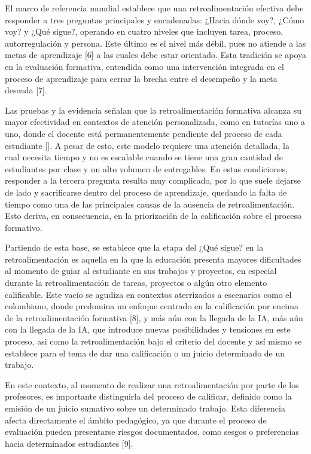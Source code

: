\documentclass[letterpaper, 10 pt, conference]{ieeeconf}  %
\begin{document}
    El marco de referencia mundial establece que una retroalimentación efectiva debe responder a tres preguntas principales y encadenadas: ¿Hacia dónde voy?, ¿Cómo voy? y ¿Qué sigue?, operando en cuatro niveles que incluyen tarea, proceso, autorregulación y persona. Este último es el nivel más débil, pues no atiende a las metas de aprendizaje [6] a las cuales debe estar orientado. Esta tradición se apoya en la evaluación formativa, entendida como una intervención integrada en el proceso de aprendizaje para cerrar la brecha entre el desempeño y la meta deseada [7].

    Las pruebas y la evidencia señalan que la retroalimentación formativa alcanza su mayor efectividad en contextos de atención personalizada, como en tutorías uno a uno, donde el docente está permanentemente pendiente del proceso de cada estudiante []. A pesar de esto, este modelo requiere una atención detallada, la cual necesita tiempo y no es escalable cuando se tiene una gran cantidad de estudiantes por clase y un alto volumen de entregables. En estas condiciones, responder a la tercera pregunta resulta muy complicado, por lo que suele dejarse de lado y sacrificarse dentro del proceso de aprendizaje, quedando la falta de tiempo como una de las principales causas de la ausencia de retroalimentación. Esto deriva, en consecuencia, en la priorización de la calificación sobre el proceso formativo. 
    
    Partiendo de esta base, se establece que la etapa del ¿Qué sigue? en la retroalimentación es aquella en la que la educación presenta mayores dificultades al momento de guiar al estudiante en sus trabajos y proyectos, en especial durante la retroalimentación de tareas, proyectos o algún otro elemento calificable. Este vacío se agudiza en contextos aterrizados a escenarios como el colombiano, donde predomina un enfoque centrado en la calificación por encima de la retroalimentación formativa [8], y más aún con la llegada de la IA, más aún con la llegada de la IA, que introduce nuevas posibilidades y tensiones en este proceso, asi como la retroalimentación bajo el criterio del docente y así mismo se establece para el tema de dar una calificación o un juicio determinado de un trabajo.

    En este contexto, al momento de realizar una retroalimentación por parte de los profesores, es importante distinguirla del proceso de calificar, definido como la emisión de un juicio sumativo sobre un determinado trabajo. Esta diferencia afecta directamente el ámbito pedagógico, ya que durante el proceso de evaluación pueden presentarse riesgos documentados, como sesgos o preferencias hacia determinados estudiantes [9].
\end{document}
